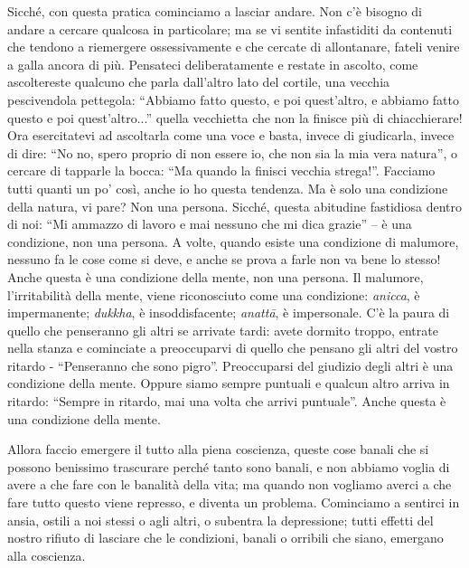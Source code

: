 Sicché, con questa pratica cominciamo a lasciar andare. Non c'è bisogno
di andare a cercare qualcosa in particolare; ma se vi sentite
infastiditi da contenuti che tendono a riemergere ossessivamente e che
cercate di allontanare, fateli venire a galla ancora di più. Pensateci
deliberatamente e restate in ascolto, come ascoltereste qualcuno che
parla dall'altro lato del cortile, una vecchia pescivendola pettegola:
``Abbiamo fatto questo, e poi quest'altro, e abbiamo fatto questo e poi
quest'altro...'' quella vecchietta che non la finisce più di
chiacchierare! Ora esercitatevi ad ascoltarla come una voce e basta,
invece di giudicarla, invece di dire: ``No no, spero proprio di non
essere io, che non sia la mia vera natura'', o cercare di tapparle la
bocca: ``Ma quando la finisci vecchia strega!''. Facciamo tutti quanti un
po' così, anche io ho questa tendenza. Ma è solo una condizione della
natura, vi pare? Non una persona. Sicché, questa abitudine fastidiosa
dentro di noi: ``Mi ammazzo di lavoro e mai nessuno che mi dica grazie'' –
è una condizione, non una persona. A volte, quando esiste una condizione
di malumore, nessuno fa le cose come si deve, e anche se prova a farle
non va bene lo stesso! Anche questa è una condizione della mente, non
una persona. Il malumore, l'irritabilità della mente, viene riconosciuto
come una condizione: \textit{anicca}, è impermanente; \textit{dukkha}, è insoddisfacente;
\textit{anattā}, è impersonale. C'è la paura di quello che penseranno gli altri
se arrivate tardi: avete dormito troppo, entrate nella stanza e
cominciate a preoccuparvi di quello che pensano gli altri del vostro
ritardo - ``Penseranno che sono pigro''. Preoccuparsi del giudizio degli
altri è una condizione della mente. Oppure siamo sempre puntuali e
qualcun altro arriva in ritardo: ``Sempre in ritardo, mai una volta che
arrivi puntuale''. Anche questa è una condizione della mente.

Allora faccio emergere il tutto alla piena coscienza, queste cose banali
che si possono benissimo trascurare perché tanto sono banali, e non
abbiamo voglia di avere a che fare con le banalità della vita; ma quando
non vogliamo averci a che fare tutto questo viene represso, e diventa un
problema. Cominciamo a sentirci in ansia, ostili a noi stessi o agli
altri, o subentra la depressione; tutti effetti del nostro rifiuto di
lasciare che le condizioni, banali o orribili che siano, emergano alla
coscienza.


